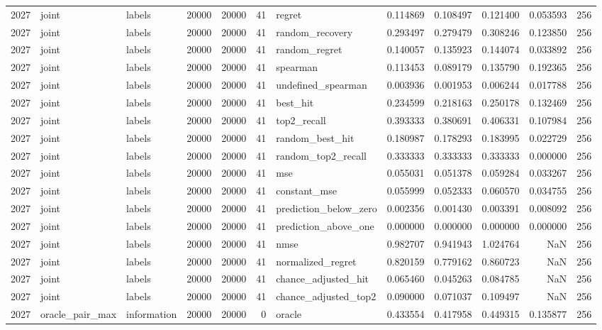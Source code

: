 \begin{tabular}{rllrrrlrrrrr}
2027 & joint & labels & 20000 & 20000 & 41 & regret & 0.114869 & 0.108497 & 0.121400 & 0.053593 & 256 \\
2027 & joint & labels & 20000 & 20000 & 41 & random_recovery & 0.293497 & 0.279479 & 0.308246 & 0.123850 & 256 \\
2027 & joint & labels & 20000 & 20000 & 41 & random_regret & 0.140057 & 0.135923 & 0.144074 & 0.033892 & 256 \\
2027 & joint & labels & 20000 & 20000 & 41 & spearman & 0.113453 & 0.089179 & 0.135790 & 0.192365 & 256 \\
2027 & joint & labels & 20000 & 20000 & 41 & undefined_spearman & 0.003936 & 0.001953 & 0.006244 & 0.017788 & 256 \\
2027 & joint & labels & 20000 & 20000 & 41 & best_hit & 0.234599 & 0.218163 & 0.250178 & 0.132469 & 256 \\
2027 & joint & labels & 20000 & 20000 & 41 & top2_recall & 0.393333 & 0.380691 & 0.406331 & 0.107984 & 256 \\
2027 & joint & labels & 20000 & 20000 & 41 & random_best_hit & 0.180987 & 0.178293 & 0.183995 & 0.022729 & 256 \\
2027 & joint & labels & 20000 & 20000 & 41 & random_top2_recall & 0.333333 & 0.333333 & 0.333333 & 0.000000 & 256 \\
2027 & joint & labels & 20000 & 20000 & 41 & mse & 0.055031 & 0.051378 & 0.059284 & 0.033267 & 256 \\
2027 & joint & labels & 20000 & 20000 & 41 & constant_mse & 0.055999 & 0.052333 & 0.060570 & 0.034755 & 256 \\
2027 & joint & labels & 20000 & 20000 & 41 & prediction_below_zero & 0.002356 & 0.001430 & 0.003391 & 0.008092 & 256 \\
2027 & joint & labels & 20000 & 20000 & 41 & prediction_above_one & 0.000000 & 0.000000 & 0.000000 & 0.000000 & 256 \\
2027 & joint & labels & 20000 & 20000 & 41 & nmse & 0.982707 & 0.941943 & 1.024764 & NaN & 256 \\
2027 & joint & labels & 20000 & 20000 & 41 & normalized_regret & 0.820159 & 0.779162 & 0.860723 & NaN & 256 \\
2027 & joint & labels & 20000 & 20000 & 41 & chance_adjusted_hit & 0.065460 & 0.045263 & 0.084785 & NaN & 256 \\
2027 & joint & labels & 20000 & 20000 & 41 & chance_adjusted_top2 & 0.090000 & 0.071037 & 0.109497 & NaN & 256 \\
2027 & oracle_pair_max & information & 20000 & 20000 & 0 & oracle & 0.433554 & 0.417958 & 0.449315 & 0.135877 & 256 \\

\end{tabular}
